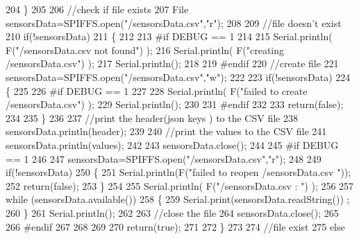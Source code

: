 \begin{DoxyCode}
204     \}
205 
206     \textcolor{comment}{//check if file exists}
207     File sensorsData=SPIFFS.open(\textcolor{stringliteral}{"/sensorsData.csv"},\textcolor{stringliteral}{"r"});
208     
209     \textcolor{comment}{//file doesn't exist}
210     \textcolor{keywordflow}{if}(!sensorsData)
211     \{
212     
213 \textcolor{preprocessor}{    #if DEBUG == 1}
214     
215         Serial.println( F(\textcolor{stringliteral}{"/sensorsData.csv not found"}) );
216         Serial.println( F(\textcolor{stringliteral}{"creating /sensorsData.csv"}) );
217         Serial.println();
218     
219 \textcolor{preprocessor}{    #endif}
220         \textcolor{comment}{//create file}
221         sensorsData=SPIFFS.open(\textcolor{stringliteral}{"/sensorsData.csv"},\textcolor{stringliteral}{"w"});
222         
223         \textcolor{keywordflow}{if}(!sensorsData)
224         \{
225 
226 \textcolor{preprocessor}{        #if DEBUG == 1}
227         
228             Serial.println( F(\textcolor{stringliteral}{"failed to create /sensorsData.csv"}) );
229             Serial.println();
230         
231 \textcolor{preprocessor}{        #endif}
232         
233             \textcolor{keywordflow}{return}(\textcolor{keyword}{false});
234 
235         \}
236         
237         \textcolor{comment}{//print the header(json keys ) to the CSV file}
238         sensorsData.println(header);
239 
240         \textcolor{comment}{//print the values to the CSV file}
241         sensorsData.println(values);
242         
243         sensorsData.close();
244     
245 \textcolor{preprocessor}{    #if DEBUG == 1}
246 
247         sensorsData=SPIFFS.open(\textcolor{stringliteral}{"/sensorsData.csv"},\textcolor{stringliteral}{"r"});
248         
249         \textcolor{keywordflow}{if}(!sensorsData)
250         \{
251             Serial.println(F(\textcolor{stringliteral}{"failed to reopen /sensorsData.csv "}));
252             \textcolor{keywordflow}{return}(\textcolor{keyword}{false});      
253         \}
254 
255         Serial.println( F(\textcolor{stringliteral}{"/sensorsData.csv : "}) );
256 
257         \textcolor{keywordflow}{while} (sensorsData.available()) 
258         \{
259             Serial.print(sensorsData.readString()) ;
260         \}
261         Serial.println();
262 
263         \textcolor{comment}{//close the file}
264         sensorsData.close();
265 
266 \textcolor{preprocessor}{    #endif}
267         
268 
269         
270         \textcolor{keywordflow}{return}(\textcolor{keyword}{true});
271         
272     \}
273 
274     \textcolor{comment}{//file exist}
275     \textcolor{keywordflow}{else}

\end{DoxyCode}

